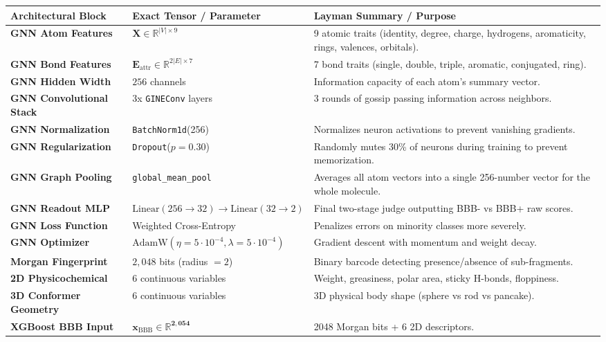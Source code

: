 \documentclass[11pt,a4paper]{article}
\begin{document}
\begin{table}[h!]
\centering
\small
\renewcommand{\arraystretch}{1.25}
\begin{tabularx}{\textwidth}{p{4.2cm} p{4.2cm} X}
\toprule
\textbf{Architectural Block} & \textbf{Exact Tensor / Parameter} & \textbf{Layman Summary / Purpose} \\
\midrule
\textbf{GNN Atom Features} & $\mathbf{X} \in \mathbb{R}^{|V| \times 9}$ & 9 atomic traits (identity, degree, charge, hydrogens, aromaticity, rings, valences, orbitals). \\
\textbf{GNN Bond Features} & $\mathbf{E}_{\text{attr}} \in \mathbb{R}^{2|E| \times 7}$ & 7 bond traits (single, double, triple, aromatic, conjugated, ring). \\
\textbf{GNN Hidden Width} & $256$ channels & Information capacity of each atom's summary vector. \\
\textbf{GNN Convolutional Stack} & 3x \texttt{GINEConv} layers & 3 rounds of gossip passing information across neighbors. \\
\textbf{GNN Normalization} & \texttt{BatchNorm1d}(256) & Normalizes neuron activations to prevent vanishing gradients. \\
\textbf{GNN Regularization} & \texttt{Dropout}($p=0.30$) & Randomly mutes 30\% of neurons during training to prevent memorization. \\
\textbf{GNN Graph Pooling} & \texttt{global\_mean\_pool} & Averages all atom vectors into a single 256-number vector for the whole molecule. \\
\textbf{GNN Readout MLP} & $\text{Linear}(256 \to 32) \to \text{Linear}(32 \to 2)$ & Final two-stage judge outputting BBB- vs BBB+ raw scores. \\
\textbf{GNN Loss Function} & Weighted Cross-Entropy & Penalizes errors on minority classes more severely. \\
\textbf{GNN Optimizer} & $\text{AdamW}(\eta=5\cdot 10^{-4}, \lambda=5\cdot 10^{-4})$ & Gradient descent with momentum and weight decay. \\
\textbf{Morgan Fingerprint} & $2,048$ bits (radius $= 2$) & Binary barcode detecting presence/absence of sub-fragments. \\
\textbf{2D Physicochemical} & $6$ continuous variables & Weight, greasiness, polar area, sticky H-bonds, floppiness. \\
\textbf{3D Conformer Geometry} & $6$ continuous variables & 3D physical body shape (sphere vs rod vs pancake). \\
\textbf{XGBoost BBB Input} & $\mathbf{x}_{\text{BBB}} \in \mathbb{R}^{\mathbf{2,054}}$ & 2048 Morgan bits + 6 2D descriptors. \\

\end{tabularx}
\end{table}
\end{document}
